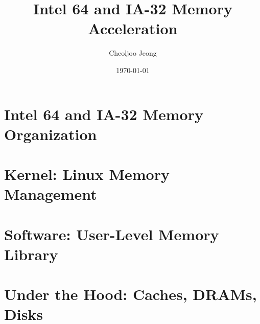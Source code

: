 \documentclass{report}
\begin{document}
\title{\Huge\bf Intel 64 and IA-32 Memory Acceleration}
\author{\Large Cheoljoo Jeong}
\date{\Large \today}
\maketitle

\tableofcontents

\part{Intel 64 and IA-32 Memory Organization}


\part{Kernel: Linux Memory Management}


\part{Software: User-Level Memory Library}

\part{Under the Hood: Caches, DRAMs, Disks}




\nocite{ia32sw-1,BC06}
\end{document}
